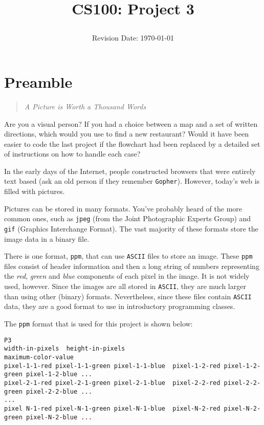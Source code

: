 \documentclass[12pt]{article}
\title{CS100: Project 3\\
\date{Revision Date: \today}}
\begin{document}
\maketitle

\thispagestyle{empty}

\W\subsubsection*{}
\W\htmlrule


\section*{Preamble}

\begin{quote}
{\it A Picture is Worth a Thousand Words}
\end{quote}

Are you a visual person?  If you had a choice between a map and a set of written
directions, which would you use to find a new restaurant?  Would it have been
easier to code the last project if the flowchart had been replaced by a detailed
set of instructions on how to handle each case?

In the early days of the Internet, people constructed browsers that were entirely
text based (ask an old person if they remember {\tt Gopher}).  However, today's web
is filled with pictures.

Pictures can be stored in many formats.  You've probably heard of the more common
ones, such as {\tt jpeg} (from the Joint Photographic Experts Group)
and {\tt gif} (Graphics Interchange Format).
The vast majority of these formats store the image data in
a binary file.

There is one format, {\tt ppm}, that can use {\tt ASCII} files
to store an image.  These {\tt ppm} files consist of header information
and then a long string of numbers representing the {\it red}, {\it green} and
{\it blue} components of each pixel in the image.  It is not widely used, however.
Since the images are all stored in {\tt ASCII}, they are much larger than
using other (binary) formats.  Nevertheless, since these files contain {\tt ASCII}
data, they are a good format to use in introductory programming classes.

The {\tt ppm} format that is used for this project is shown below:

\begin{verbatim}
P3
width-in-pixels  height-in-pixels
maximum-color-value
pixel-1-1-red pixel-1-1-green pixel-1-1-blue  pixel-1-2-red pixel-1-2-green pixel-1-2-blue ...
pixel-2-1-red pixel-2-1-green pixel-2-1-blue  pixel-2-2-red pixel-2-2-green pixel-2-2-blue ...
...
pixel N-1-red pixel-N-1-green pixel-N-1-blue  pixel-N-2-red pixel-N-2-green pixel-N-2-blue ...
\end{verbatim}
\end{document}
